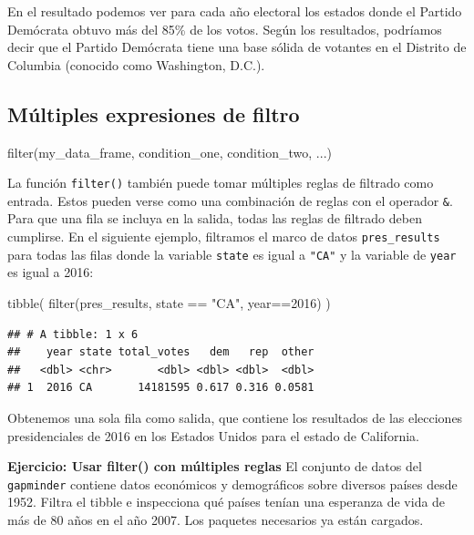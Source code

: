 \documentclass[
]{book}
\newenvironment{Shaded}{\begin{snugshade}}{\end{snugshade}}
\newcommand{\DecValTok}[1]{\textcolor[rgb]{0.00,0.00,0.81}{#1}}
\newcommand{\FunctionTok}[1]{\textcolor[rgb]{0.00,0.00,0.00}{#1}}
\newcommand{\NormalTok}[1]{#1}
\newcommand{\SpecialCharTok}[1]{\textcolor[rgb]{0.00,0.00,0.00}{#1}}
\newcommand{\StringTok}[1]{\textcolor[rgb]{0.31,0.60,0.02}{#1}}
\begin{document}
En el resultado podemos ver para cada año electoral los estados donde el Partido Demócrata obtuvo más del 85\% de los votos. Según los resultados, podríamos decir que el Partido Demócrata tiene una base sólida de votantes en el Distrito de Columbia (conocido como Washington, D.C.).

\hypertarget{muxfaltiples-expresiones-de-filtro}{%
\subsection{Múltiples expresiones de filtro}\label{muxfaltiples-expresiones-de-filtro}}

\begin{Shaded}
\begin{Highlighting}[]
\FunctionTok{filter}\NormalTok{(my\_data\_frame, condition\_one, condition\_two, ...)}
\end{Highlighting}
\end{Shaded}

La función \texttt{filter()} también puede tomar múltiples reglas de filtrado como entrada. Estos pueden verse como una combinación de reglas con el operador \texttt{\&}. Para que una fila se incluya en la salida, todas las reglas de filtrado deben cumplirse. En el siguiente ejemplo, filtramos el marco de datos \texttt{pres\_results} para todas las filas donde la variable \texttt{state} es igual a \texttt{"CA"} y la variable de \texttt{year} es igual a 2016:

\begin{Shaded}
\begin{Highlighting}[]
\FunctionTok{tibble}\NormalTok{(}
\FunctionTok{filter}\NormalTok{(pres\_results, state }\SpecialCharTok{==} \StringTok{"CA"}\NormalTok{, year}\SpecialCharTok{==}\DecValTok{2016}\NormalTok{)}
\NormalTok{)}
\end{Highlighting}
\end{Shaded}

\begin{verbatim}
## # A tibble: 1 x 6
##    year state total_votes   dem   rep  other
##   <dbl> <chr>       <dbl> <dbl> <dbl>  <dbl>
## 1  2016 CA       14181595 0.617 0.316 0.0581
\end{verbatim}

Obtenemos una sola fila como salida, que contiene los resultados de las elecciones presidenciales de 2016 en los Estados Unidos para el estado de California.

\textbf{Ejercicio: Usar filter() con múltiples reglas}
El conjunto de datos del \texttt{gapminder} contiene datos económicos y demográficos sobre diversos países desde 1952. Filtra el tibble e inspecciona qué países tenían una esperanza de vida de más de 80 años en el año 2007. Los paquetes necesarios ya están cargados.
\end{document}
